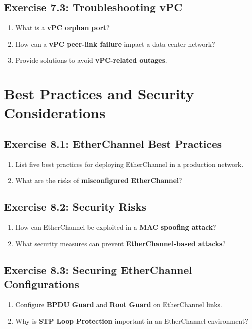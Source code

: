 \documentclass[a4paper]{article}
\begin{document}
\subsection{Exercise 7.3: Troubleshooting vPC}
\begin{enumerate}
    \item What is a \textbf{vPC orphan port}?
    \item How can a \textbf{vPC peer-link failure} impact a data center network?
    \item Provide solutions to avoid \textbf{vPC-related outages}.
\end{enumerate}

\section{Best Practices and Security Considerations}
\subsection{Exercise 8.1: EtherChannel Best Practices}
\begin{enumerate}
    \item List five best practices for deploying EtherChannel in a production network.
    \item What are the risks of \textbf{misconfigured EtherChannel}?
\end{enumerate}

\subsection{Exercise 8.2: Security Risks}
\begin{enumerate}
    \item How can EtherChannel be exploited in a \textbf{MAC spoofing attack}?
    \item What security measures can prevent \textbf{EtherChannel-based attacks}?
\end{enumerate}

\subsection{Exercise 8.3: Securing EtherChannel Configurations}
\begin{enumerate}
    \item Configure \textbf{BPDU Guard} and \textbf{Root Guard} on EtherChannel links.
    \item Why is \textbf{STP Loop Protection} important in an EtherChannel environment?
\end{enumerate}
\end{document}
